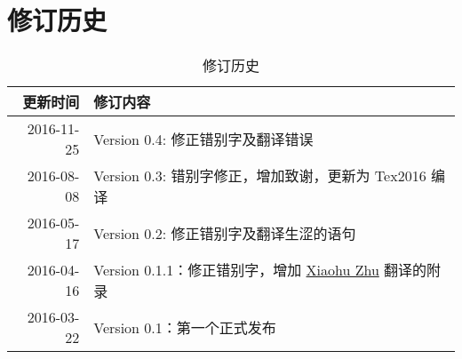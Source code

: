 
\chapter{修订历史}

\begin{table}[h]
  \centering
  \begin{tabularx}{0.9\textwidth}{ r X }
    \toprule
    \textbf{更新时间} & \textbf{修订内容}\\
    \midrule
    2016-11-25 & Version 0.4: 修正错别字及翻译错误 \\
    \midrule
    2016-08-08 & Version 0.3: 错别字修正，增加致谢，更新为 Tex2016 编译 \\
    \midrule
    2016-05-17 & Version 0.2: 修正错别字及翻译生涩的语句 \\
    \midrule
    2016-04-16 & Version 0.1.1：修正错别字，增加 \href{mailto:xhzhu.nju@gmail}{Xiaohu Zhu} 翻译的附录\\
    \midrule
    2016-03-22 & Version 0.1：第一个正式发布\\
    \bottomrule
  \end{tabularx}
  \caption{修订历史}
  \label{table:DocumentChanges}
\end{table}

